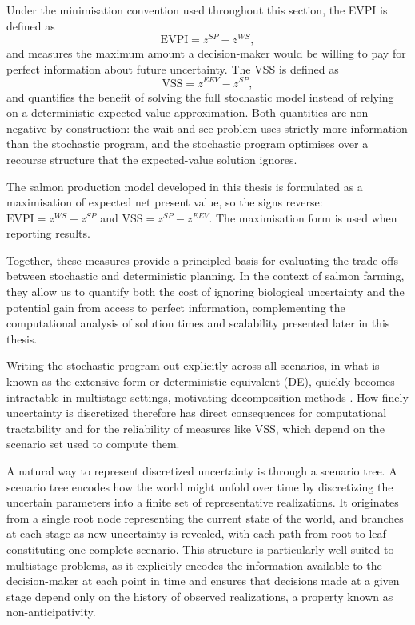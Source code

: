 \documentclass[12pt,a4paper]{article}
\begin{document}
Under the minimisation convention used throughout this section, the EVPI
is defined as
\begin{equation}
  \text{EVPI} = z^{SP} - z^{WS},
\end{equation}
and measures the maximum amount a decision-maker would be willing to pay
for perfect information about future uncertainty. The VSS is defined as
\begin{equation}
  \text{VSS} = z^{EEV} - z^{SP},
\end{equation}
and quantifies the benefit of solving the full stochastic model instead of
relying on a deterministic expected-value approximation. Both quantities
are non-negative by construction: the wait-and-see problem uses strictly
more information than the stochastic program, and the stochastic program
optimises over a recourse structure that the expected-value solution
ignores.
 
The salmon production model developed in this thesis is formulated as a
maximisation of expected net present value, so the signs reverse:
$\text{EVPI} = z^{WS} - z^{SP}$ and $\text{VSS} = z^{SP} - z^{EEV}$. The
maximisation form is used when reporting results.
 
Together, these measures provide a principled basis for evaluating the
trade-offs between stochastic and deterministic planning. In the context of
salmon farming, they allow us to quantify both the cost of ignoring
biological uncertainty and the potential gain from access to perfect
information, complementing the computational analysis of solution times and
scalability presented later in this thesis.
 
Writing the stochastic program out explicitly across all scenarios, in what is known as the extensive form or deterministic equivalent (DE), quickly becomes intractable in multistage settings, motivating decomposition methods \citep{birge2011introduction, shapiro2014lectures, king2012modeling}. How finely uncertainty is discretized therefore has direct consequences for computational tractability and for the reliability of measures like VSS, which depend on the scenario set used to compute them.
 
A natural way to represent discretized uncertainty is through a scenario tree. A scenario tree encodes how the world might unfold over time by discretizing the uncertain parameters into a finite set of representative realizations. It originates from a single root node representing the current state of the world, and branches at each stage as new uncertainty is revealed, with each path from root to leaf constituting one complete scenario. This structure is particularly well-suited to multistage problems, as it explicitly encodes the information available to the decision-maker at each point in time and ensures that decisions made at a given stage depend only on the history of observed realizations, a property known as non-anticipativity.
 
\end{document}
